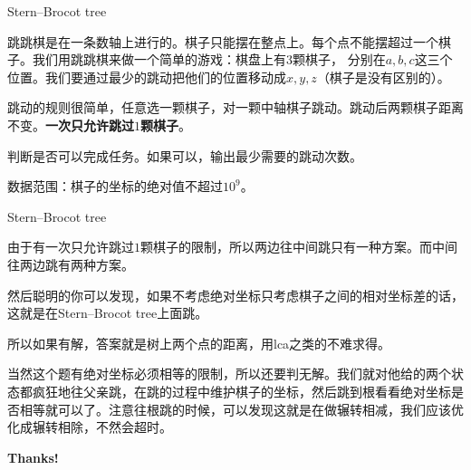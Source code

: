 \documentclass{ctexbeamer}        %
\begin{document}
\begin{frame}{Stern–Brocot tree}

\begin{example}[accoders2169]
跳跳棋是在一条数轴上进行的。棋子只能摆在整点上。每个点不能摆超过一个棋子。我们用跳跳棋来做一个简单的游戏：棋盘上有$3$颗棋子， 分别在$a,b,c$这三个位置。我们要通过最少的跳动把他们的位置移动成$x,y,z$（棋子是没有区别的）。

跳动的规则很简单，任意选一颗棋子，对一颗中轴棋子跳动。跳动后两颗棋子距离不变。\textbf{一次只允许跳过$1$颗棋子}。

判断是否可以完成任务。如果可以，输出最少需要的跳动次数。

数据范围：棋子的坐标的绝对值不超过$10^9$。
\end{example}
\end{frame}

\begin{frame}{Stern–Brocot tree}

由于有一次只允许跳过$1$颗棋子的限制，所以两边往中间跳只有一种方案。而中间往两边跳有两种方案。

然后聪明的你可以发现，如果不考虑绝对坐标只考虑棋子之间的相对坐标差的话，这就是在Stern–Brocot tree上面跳。

所以如果有解，答案就是树上两个点的距离，用lca之类的不难求得。

当然这个题有绝对坐标必须相等的限制，所以还要判无解。我们就对他给的两个状态都疯狂地往父亲跳，在跳的过程中维护棋子的坐标，然后跳到根看看绝对坐标是否相等就可以了。注意往根跳的时候，可以发现这就是在做辗转相减，我们应该优化成辗转相除，不然会超时。

\end{frame}

\begin{frame}[plain]    %
	\vspace{0.4\textheight}
	\begin{center}
		\Huge\color{blue}\bfseries Thanks!
	\end{center}
\end{frame}
\end{document}
